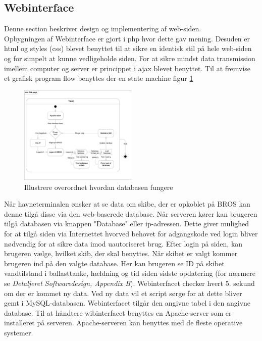 \subsection{Webinterface}
Denne section beskriver design og implementering af web-siden.\\
Opbygningen af Webinterface er gjort i php hvor dette gav mening. Desuden er html og styles (css) blevet benyttet til at sikre en identisk stil på hele web-siden og for simpelt at kunne vedligeholde siden. For at sikre mindst data transmission imellem computer og server er princippet i ajax blevet benyttet.
Til at fremvise et grafisk program flow benyttes der en state machine figur \ref{fig:stm_web}
 
\begin{figure}[H]
\centering
\includegraphics[width = 0.5\textwidth]{billeder/Systemarkitektur/stm_web}
\caption{Illustrere overordnet hvordan databasen fungere}
\label{fig:stm_web}
\end{figure}

Når havneterminalen ønsker at se data om skibe, der er opkoblet på BROS kan denne tilgå disse via den web-baserede database. Når serveren kører kan brugeren tilgå databasen via knappen "Database" eller ip-adressen. Dette giver mulighed for at tilgå siden via Internettet hvorved behovet for adgangskode ved login bliver nødvendig for at sikre data imod uautoriseret brug. Efter login på siden, kan brugeren vælge, hvilket skib, der skal benyttes. Når skibet er valgt kommer brugeren ind på den valgte database. Her kan brugeren se ID på skibet vandtilstand i ballasttanke, hældning og tid siden sidste opdatering (for nærmere se \textit{Detaljeret Softwaredesign, Appendix B}). Webinterfacet checker hvert 5. sekund om der er kommet ny data. Ved ny data vil et script sørge for at dette bliver gemt i MySQL-databasen. Webinterfacet tilgår den angivne tabel i den angivne database. Til at håndtere wibinterfacet benyttes en Apache-server som er installeret på serveren. Apache-serveren kan benyttes med de fleste operative systemer.

